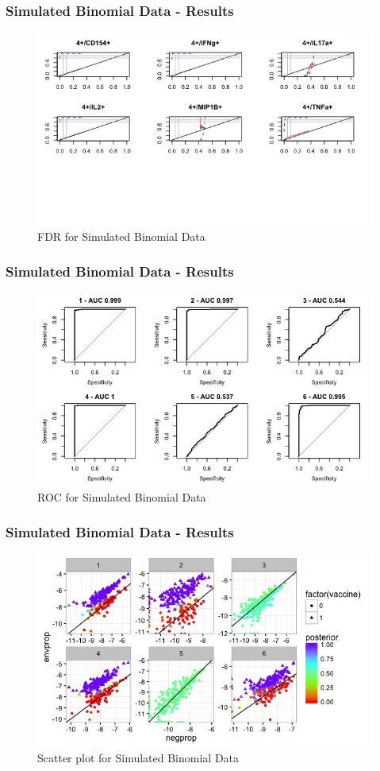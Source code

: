 \documentclass{beamer}
\theoremstyle{definition}
\begin{document}
\begin{frame}
\frametitle{Simulated Binomial Data - Results}
\begin{figure}[]
\includegraphics[width=12 cm]{figures/artificialBinomFDR} \caption{FDR for Simulated Binomial Data}
\end{figure}
\end{frame}


\begin{frame}
\frametitle{Simulated Binomial Data - Results}
\begin{figure}[]
\includegraphics[width=12 cm]{figures/artificialBinomROC} \caption{ROC for Simulated Binomial Data}
\end{figure}
\end{frame}


\begin{frame}
\frametitle{Simulated Binomial Data - Results}
\begin{figure}[]
\includegraphics[width=12 cm]{figures/artificialBinomScatter} \caption{Scatter plot for Simulated Binomial Data}
\end{figure}
\end{frame}
\end{document}
